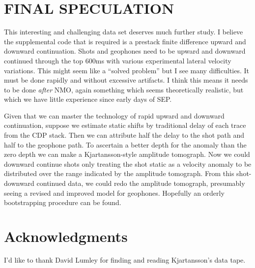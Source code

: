 \section{FINAL SPECULATION}
This interesting and challenging data set deserves much further study.
I believe the supplemental code that is required is a prestack
finite difference upward and downward continuation.
Shots and geophones need to be upward and downward continued
through the top 600ms
with various experimental lateral velocity variations.
This might seem like a ``solved problem'' but
I see many difficulties.
It must be done rapidly and without excessive artifacts.
I think this means
it needs to be done {\it after} NMO,
again something which seems theoretically realistic,
but which we have little experience since early days of SEP.
\par
Given that we can master the technology of rapid upward
and downward continuation, suppose we estimate static shifts
by traditional delay of each trace from the CDP stack.
Then we can attribute half the delay to the shot path
and half to the geophone path.
To ascertain a better depth for the anomaly than the zero depth
we can make a Kjartansson-style amplitude tomograph.
Now we could downward continue shots only
treating the shot static as a velocity anomaly
to be distributed over the range indicated by the amplitude tomograph.
From this shot-downward continued data,
we could redo the amplitude tomograph,
presumably seeing a revised and improved model for geophones.
Hopefully an orderly bootstrapping procedure can be found.


\section{Acknowledgments}
I'd like to thank David Lumley for finding and reading
Kjartansson's data tape.






